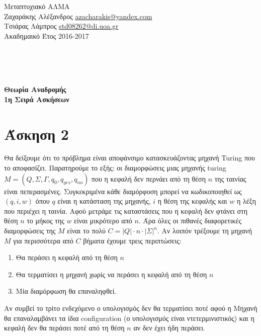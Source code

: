 \documentclass[11pt]{article}
\begin{document}
\noindent\begin{minipage}{\textwidth}

  \begin{minipage}[b]{.6\textwidth}
    \large{
      Μεταπτυχιακό ΑΛΜΑ\\
      Ζαχαράκης Αλέξανδρος \href{mailto:azacharakis@yandex.com}{azacharakis@yandex.com}\\
      Τσιάρας Λάμπρος \href{mailto:std08262@di.uoa.gr}{std08262@di.uoa.gr} \\
      Ακαδημαικό Έτος 2016-2017
    }
    \\
  \end{minipage}

\end{minipage}
\\ \\ \\
\begin{center}
  \textbf{\Large{Θεωρία Αναδρομής}}\\
  \textbf{\Large{1η Σειρά Ασκήσεων}}
\end{center}                


\section*{Άσκηση 2}
Θα δείξουμε ότι το πρόβλημα είναι αποφάνσιμο κατασκευάζοντας μηχανή Turing που το αποφασίζει.
Παρατηρούμε το εξής: οι διαμορφώσεις μιας μηχανής turing $M=(Q,\Sigma,\Gamma,q_0,q_{yes},q_{no})$ 
που η κεφαλή δεν περνάει από τη θέση $n$ της ταινίας είναι πεπερασμένες. Συγκεκριμένα κάθε διαμόρφοση μπορεί
να κωδικοποιηθεί ως $(q,i,w)$ όπου $q$ είναι η κατάσταση της μηχανής, $i$ η θέση της κεφαλής και $w$ η 
λέξη που περιέχει η ταινία.  Αφού μετράμε τις καταστάσεις που η κεφαλή δεν φτάνει στη θέση $n$ το
μήκος της $w$ είναι μικρότερο από $n$.  Άρα όλες οι πιθανές διαφορετικές διαμορφώσεις της $M$ είναι το 
πολύ $C=|Q|\cdot n\cdot |\Sigma|^n$. Αν λοιπόν τρέξουμε τη μηχανή $M$ για περισσότερα από $C$ βήματα
έχουμε τρεις περιπτώσεις: 
\begin{enumerate}
    \item Θα περάσει η κεφαλή από τη θέση $n$
    \item Θα τερματίσει η μηχανή χωρίς να περάσει η κεφαλή από τη θέση $n$
    \item Μία διαμόρφωση θα επαναληφθεί.
\end{enumerate}
Αν συμβεί το τρίτο ενδεχόμενο ο υπολογισμός δεν θα τερματίσει ποτέ αφού η Μηχανή θα επαναλαμβάνει 
τα ίδια configuration (ο υπολογισμός είναι ντετερμινιστικός) και η κεφαλή δεν θα περάσει ποτέ από 
τη θέση $n$ αν δεν έχει ήδη περάσει.
\end{document}
